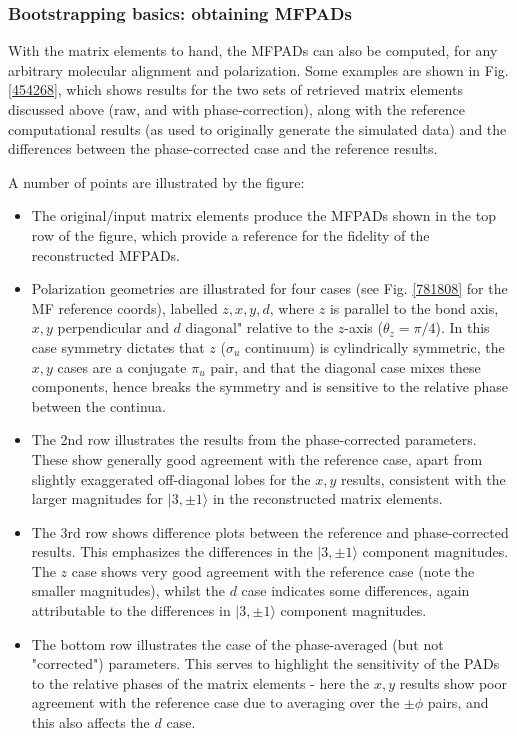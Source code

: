 \subsubsection{Bootstrapping basics: obtaining MFPADs}

With the matrix elements to hand, the MFPADs can also be computed, for any arbitrary molecular alignment and polarization. Some examples are shown in Fig. \ref{454268}, which shows results for the two sets of retrieved matrix elements discussed above (raw, and with phase-correction), along with the reference computational results (as used to originally generate the simulated data) and the differences between the phase-corrected case and the reference results.

A number of points are illustrated by the figure:

\begin{itemize}
\item The original/input matrix elements produce the MFPADs shown in the top row of the figure, which provide a reference for the fidelity of the reconstructed MFPADs. 
\item Polarization geometries are illustrated for four cases (see Fig. \ref{781808} for the MF reference coords), labelled $z,x,y,d$, where $z$ is parallel to the bond axis, $x,y$ perpendicular and $d$ diagonal" relative to the $z$-axis ($\theta_{z}=\pi/4$). In this case symmetry dictates that $z$ ($\sigma_u$ continuum) is cylindrically symmetric, the $x,y$ cases are a conjugate $\pi_u$ pair, and that the diagonal case mixes these components, hence breaks the symmetry and is sensitive to the relative phase between the continua.
\item The 2nd row illustrates the results from the phase-corrected parameters. These show generally good agreement with the reference case, apart from slightly exaggerated off-diagonal lobes for the $x,y$ results, consistent with the larger magnitudes for $|3,\pm1\rangle$ in the reconstructed matrix elements.
\item The 3rd row shows difference plots between the reference and phase-corrected results. This emphasizes the differences in the $|3,\pm1\rangle$ component magnitudes. The $z$ case shows very good agreement with the reference case (note the smaller magnitudes), whilst the $d$ case indicates some differences, again attributable to the differences in $|3,\pm1\rangle$ component magnitudes.
\item The bottom row illustrates the case of the phase-averaged (but not "corrected") parameters. This serves to highlight the sensitivity of the PADs to the relative phases of the matrix elements - here the $x,y$ results show poor agreement with the reference case due to averaging over the $\pm\phi$ pairs, and this also affects the $d$ case.
\end{itemize}


